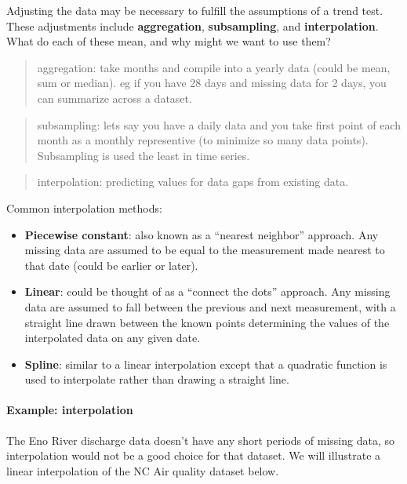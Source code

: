\documentclass[
]{article}
\providecommand{\tightlist}{%
  \setlength{\itemsep}{0pt}\setlength{\parskip}{0pt}}
\begin{document}
Adjusting the data may be necessary to fulfill the assumptions of a
trend test. These adjustments include \textbf{aggregation},
\textbf{subsampling}, and \textbf{interpolation}. What do each of these
mean, and why might we want to use them?

\begin{quote}
aggregation: take months and compile into a yearly data (could be mean,
sum or median). eg if you have 28 days and missing data for 2 days, you
can summarize across a dataset.
\end{quote}

\begin{quote}
subsampling: lets say you have a daily data and you take first point of
each month as a monthly representive (to minimize so many data points).
Subsampling is used the least in time series.
\end{quote}

\begin{quote}
interpolation: predicting values for data gaps from existing data.
\end{quote}

Common interpolation methods:

\begin{itemize}
\tightlist
\item
  \textbf{Piecewise constant}: also known as a ``nearest neighbor''
  approach. Any missing data are assumed to be equal to the measurement
  made nearest to that date (could be earlier or later).
\item
  \textbf{Linear}: could be thought of as a ``connect the dots''
  approach. Any missing data are assumed to fall between the previous
  and next measurement, with a straight line drawn between the known
  points determining the values of the interpolated data on any given
  date.
\item
  \textbf{Spline}: similar to a linear interpolation except that a
  quadratic function is used to interpolate rather than drawing a
  straight line.
\end{itemize}

\hypertarget{example-interpolation}{%
\paragraph{Example: interpolation}\label{example-interpolation}}

The Eno River discharge data doesn't have any short periods of missing
data, so interpolation would not be a good choice for that dataset. We
will illustrate a linear interpolation of the NC Air quality dataset
below.
\end{document}

